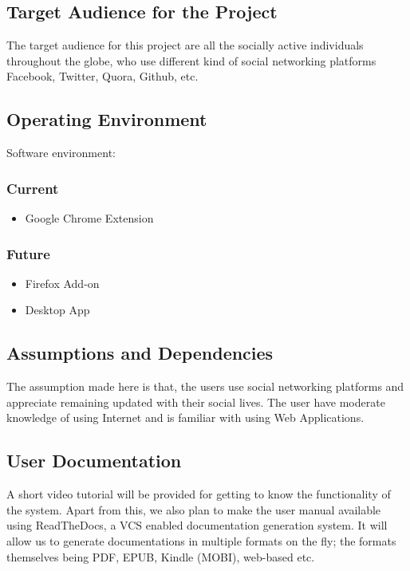 \documentclass[12pt]{article}
\begin{document}
\subsection{Target Audience for the Project}
The target audience for this project are all the socially active
individuals throughout the globe, who use different kind of social
networking platforms Facebook, Twitter, Quora, Github, etc.

\subsection{Operating Environment}
Software environment:

    \subsubsection{Current}
    \begin{itemize}
    
    \item Google Chrome Extension
    \end{itemize}
    \subsubsection{Future}
    \begin{itemize}
        \item Firefox Add-on
    \item Desktop App
    \end{itemize}
    


\subsection{Assumptions and Dependencies}
The assumption made here is that, the users use social networking platforms and appreciate remaining updated with their social lives. The user have moderate knowledge of using Internet and
is familiar with using Web Applications.

\subsection{User Documentation}
A short video tutorial will be provided for getting to know the functionality of the system. Apart from this, we also plan to make the user manual available using ReadTheDocs, a VCS enabled documentation generation system. It will allow us to generate documentations in multiple formats on the fly; the formats themselves being PDF, EPUB, Kindle (MOBI), web-based etc.
\end{document}
